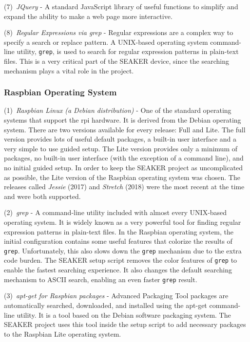 \documentclass[12pt]{article}
\begin{document}
(7)~{\em JQuery} - A standard JavaScript library of useful
functions to simplify and expand the ability to make a web page
more interactive.

(8)~{\em Regular Expressions via grep} - Regular expressions are
a complex way to specify a search or replace pattern. A UNIX-based
operating system command-line utility, \verb|grep|, is
used to search for regular expression patterns in plain-text
files.  This is a very critical part of the SEAKER device, since
the searching mechanism plays a vital role in the project.

\subsubsection {Raspbian Operating System}

(1)~{\em Raspbian Linux (a Debian distribution)} - One of the standard
operating systems that support the \gls{rpi} hardware.  It is
derived from the Debian operating system.  There are two versions
available for every release: Full and Lite.  The full version
provides lots of useful default packages, a built-in user interface
and a very simple to use guided setup.  The Lite version provides
only a minimum of packages, no built-in user interface (with the
exception of a command line), and no initial guided setup.  In
order to keep the SEAKER project as uncomplicated as possible, 
the Lite version of the Raspbian operating system was chosen.
The releases called {\em Jessie} (2017) and {\em Stretch} (2018)
were the most recent at the time and were both supported.

(2)~{\em grep} - A command-line utility included
with almost every UNIX-based operating system.  It is widely
known as a very powerful tool for finding regular expression
patterns in plain-text files.  In the Raspbian operating system,
the initial configuration contains some useful features that
colorize the results of \verb|grep|.  Unfortunately, this also slows
down the \verb|grep| mechanism due to the extra code burden.  The
SEAKER setup script removes the color features of \verb|grep| to 
enable the fastest searching experience.  It also changes the
default searching mechanism to ASCII search,
enabling an even faster \verb|grep| result.

(3)~{\em apt-get for Raspbian packages} - Advanced Packaging Tool
packages are automatically searched, downloaded, and installed
using the apt-get command-line utility.  It is a tool based
on the Debian software packaging system.  The SEAKER project
uses this tool inside the setup script to add necessary
packages to the Raspbian Lite operating system.
\end{document}
